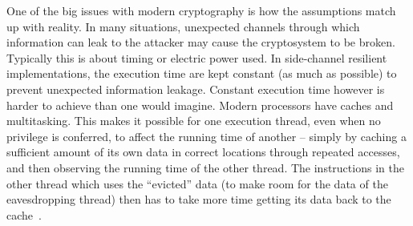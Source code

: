 
One of the big issues with modern cryptography is how the assumptions
match up with reality. In many situations, unexpected channels
through which information can leak to the attacker may cause the
cryptosystem to be broken. Typically this is about timing or
electric power used. 
In side-channel resilient implementations, the execution time
are kept constant (as much as possible) to prevent unexpected
information leakage.
Constant execution time however is harder to achieve than one would imagine.
Modern processors have caches 
and multitasking. This makes it possible for one execution
thread, even when no privilege is conferred, to affect the running
time of another -- simply by caching a sufficient amount of its own
data in correct locations through repeated accesses, and then
observing the running time of the other thread. The instructions in
the other thread which uses the ``evicted'' data (to make room for the
data of the eavesdropping thread) then has to take more time getting
its data back to the cache~\cite{B:05:CTAA}. 



